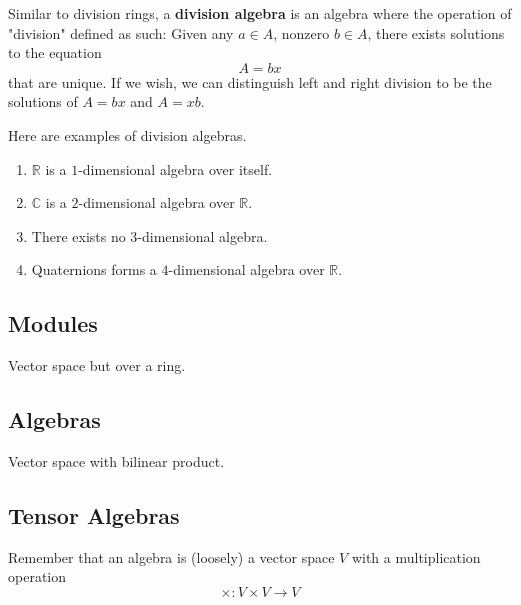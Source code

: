   \begin{definition}
    Similar to division rings, a \textbf{division algebra} is an algebra where the operation of "division" defined as such: Given any $a \in A$, nonzero $b \in A$, there exists solutions to the equation
    \begin{equation}
      A = bx
    \end{equation}
    that are unique. If we wish, we can distinguish left and right division to be the solutions of $A = b x$ and $A = x b$. 
  \end{definition}

  \begin{definition}
    Here are examples of division algebras.
    \begin{enumerate}
      \item $\mathbb{R}$ is a $1$-dimensional algebra over itself. 
      \item $\mathbb{C}$ is a $2$-dimensional algebra over $\mathbb{R}$. 
      \item There exists no $3$-dimensional algebra. 
      \item Quaternions forms a $4$-dimensional algebra over $\mathbb{R}$. 
    \end{enumerate}
  \end{definition}

\subsection{Modules}

  Vector space but over a ring. 

\subsection{Algebras}

  Vector space with bilinear product.  

\subsection{Tensor Algebras}

  Remember that an algebra is (loosely) a vector space $V$ with a multiplication operation
  \begin{equation}
    \times: V \times V \longrightarrow V
  \end{equation}

